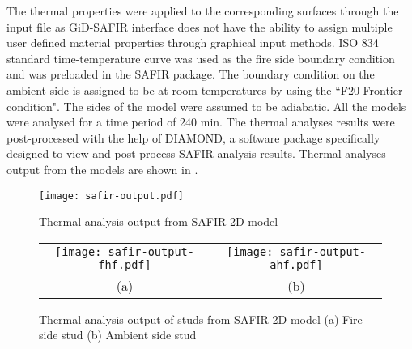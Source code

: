 The thermal properties were applied to the corresponding surfaces through the input file as GiD-SAFIR interface does not have the ability to assign multiple user defined material properties through graphical input methods. ISO 834 standard time-temperature curve was used as the fire side boundary condition and was preloaded in the SAFIR package. The boundary condition on the ambient side is assigned to be at room temperatures by using the ``F20 Frontier condition". The sides of the model were assumed to be adiabatic. All the models were analysed for a time period of 240 min. The thermal analyses results were post-processed with the help of DIAMOND, a software package specifically designed to view and post process SAFIR analysis results. Thermal analyses output from the models are shown in .
\begin{figure}[!htbp]
	\centering
	\texttt{[image: safir-output.pdf]}
	\caption{Thermal analysis output from SAFIR 2D model}
	\label{fig:safir-output}
\end{figure}
\begin{figure}[!htbp]
	\centering
		\begin{tabular}{cc}
			\texttt{[image: safir-output-fhf.pdf]} & \texttt{[image: safir-output-ahf.pdf]} \\
			(a) & (b) \\
		\end{tabular} 
		\caption{Thermal analysis output of studs from SAFIR 2D model (a) Fire side stud (b) Ambient side stud}
		\label{fig:safir-output-studs}
\end{figure}

